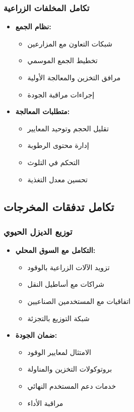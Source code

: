 \subsubsection{تكامل المخلفات الزراعية}
\begin{itemize}
    \item \textbf{نظام الجمع:}
    \begin{itemize}
        \item شبكات التعاون مع المزارعين
        \item تخطيط الجمع الموسمي
        \item مرافق التخزين والمعالجة الأولية
        \item إجراءات مراقبة الجودة
    \end{itemize}
    
    \item \textbf{متطلبات المعالجة:}
    \begin{itemize}
        \item تقليل الحجم وتوحيد المعايير
        \item إدارة محتوى الرطوبة
        \item التحكم في التلوث
        \item تحسين معدل التغذية
    \end{itemize}
\end{itemize}

\subsection{تكامل تدفقات المخرجات}

\subsubsection{توزيع الديزل الحيوي}
\begin{itemize}
    \item \textbf{التكامل مع السوق المحلي:}
    \begin{itemize}
        \item تزويد الآلات الزراعية بالوقود
        \item شراكات مع أساطيل النقل
        \item اتفاقيات مع المستخدمين الصناعيين
        \item شبكة التوزيع بالتجزئة
    \end{itemize}
    
    \item \textbf{ضمان الجودة:}
    \begin{itemize}
        \item الامتثال لمعايير الوقود
        \item بروتوكولات التخزين والمناولة
        \item خدمات دعم المستخدم النهائي
        \item مراقبة الأداء
    \end{itemize}
\end{itemize}

